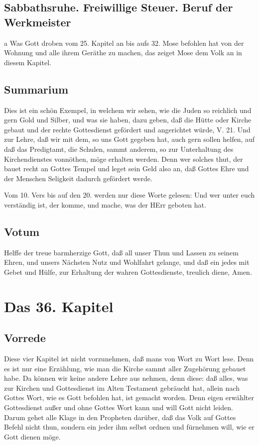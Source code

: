 \section{Sabbathsruhe. Freiwillige Steuer. Beruf der Werkmeister}

a Was Gott droben vom 25. Kapitel an bis aufs 32. Mose befohlen hat von der Wohnung und alle ihrem Geräthe zu machen, das zeiget Mose dem Volk an in diesem Kapitel.

\section{Summarium}

Dies ist ein schön Exempel, in welchem wir sehen, wie die Juden so reichlich und gern Gold und Silber, und was sie haben, dazu geben, daß die Hütte oder Kirche gebaut und der rechte Gottesdienst gefördert und angerichtet würde, V. 21. Und zur Lehre, daß wir mit dem, so uns Gott gegeben hat, auch gern sollen helfen, auf daß das Predigtamt, die Schulen, sammt anderem, so zur Unterhaltung des Kirchendienstes vonnöthen, möge erhalten werden. Denn wer solches thut, der bauet recht an Gottes Tempel und leget sein Geld also an, daß Gottes Ehre und der Menschen Seligkeit dadurch gefördert werde.

Vom 10. Vers bis auf den 20. werden nur
diese Worte gelesen: Und wer unter euch verständig ist, der komme, und mache, was der HErr geboten hat.

\section{Votum}

Helffe der treue barmherzige Gott, daß all unser Thun und Lassen zu seinem Ehren, und unsers Nächsten Nutz und Wohlfahrt gelange, und daß ein jedes mit Gebet und Hülfe, zur Erhaltung der wahren Gottesdienste, treulich diene, Amen.

\chapter{Das 36. Kapitel}

\section{Vorrede}

Diese vier Kapitel ist nicht vorzunehmen, daß mans von Wort zu Wort lese. Denn es ist nur eine Erzählung, wie man die Kirche sammt aller Zugehörung gebauet habe. Da können wir keine andere Lehre aus nehmen, denn diese: daß alles, was zur Kirchen und Gottesdienst im Alten Testament gebräucht hat, allein nach Gottes Wort, wie es Gott befohlen hat, ist gemacht worden. Denn eigen erwählter Gottesdienst außer und ohne Gottes Wort kann und will Gott nicht leiden. Darum gehet alle Klage in den Propheten darüber, daß das Volk auf Gottes Befehl nicht thun, sondern ein jeder ihm selbst ordnen und fürnehmen will, wie er Gott dienen möge.

